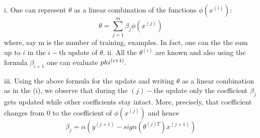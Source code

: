 \begin{answer}
i. One can represent $\theta $ as a linear combination of the functions $\phi(x^{(i)})$:
$$\theta = \sum\limits_{j = 1}^m \beta_j\phi(x^{(j)})$$
where, say m is the number of training, examples. In fact, one can the the sum up to $i$ in the
$i-$th update of $\theta.$
ii. All the $\theta^{(i)}$ are known and also using the formula $\beta_{i + 1}$ one can evaluate
$\\phi^{(i + 1)}.$

iii. Using the above formula for the update and writing $\theta$
as a linear combination as in the (i), we observe that during the $(j)-$the update only the coefficient
$\beta_j$ gets updated while other coefficients stay intact. More, precisely, that coefficient changes
from 0 to the coefficient of $\phi(x^{(j)})$ and hence
$$\beta_j = \alpha (y^{(j + 1)} - sign(\theta^{(j)T})x^{(j + 1)})$$
\end{answer}
